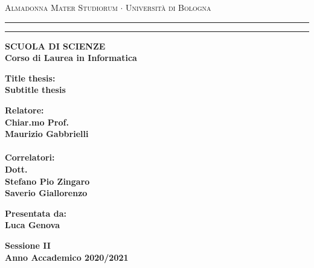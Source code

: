 \documentclass[12pt,a4paper]{report}
\begin{document}
\begin{titlepage}
\begin{center}
{{\Large{\textsc{Almadonna Mater Studiorum $\cdot$ Universit\`a di
Bologna}}}} \rule[0.1cm]{15.8cm}{0.1mm}
\rule[0.5cm]{15.8cm}{0.6mm}
{\small{\bf SCUOLA DI SCIENZE\\
Corso di Laurea in Informatica }}
\end{center}
\vspace{15mm}

\begin{center}
{\LARGE{\bf Title thesis:}}\\
\vspace{3mm}
{\LARGE{\bf Subtitle thesis}}\\
\end{center}
\vspace{40mm}
\par
\noindent
\begin{minipage}[t]{0.47\textwidth}
{\large{\bf Relatore:\\
Chiar.mo Prof.\\
Maurizio Gabbrielli\\
\\
Correlatori:\\
Dott.\\
Stefano Pio Zingaro\\
Saverio Giallorenzo\\
}}
\end{minipage}
\hfill
\begin{minipage}[t]{0.47\textwidth}\raggedleft
{\large{\bf Presentata da:\\
Luca Genova}}
\end{minipage}
\vspace{20mm}
\begin{center}
{\large{\bf Sessione II\\%
Anno Accademico 2020/2021}}%
\end{center}
\end{titlepage}
\end{document}
